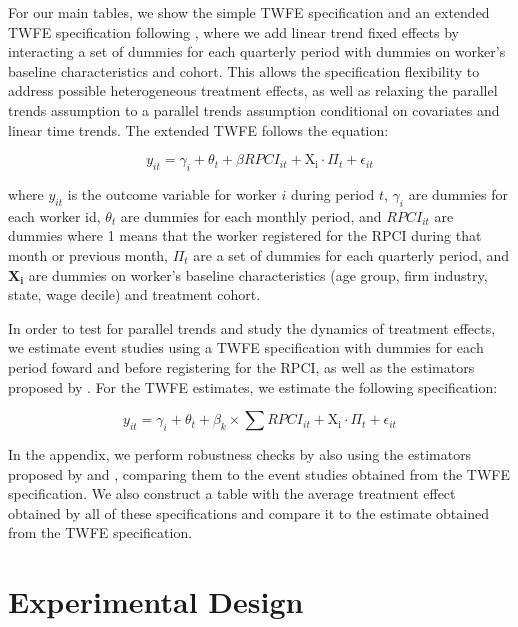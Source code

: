 \documentclass[oneside,11pt]{article}
\begin{document}
For our main tables, we show the simple TWFE specification and an extended TWFE specification following \cite{wooldridge2021two}, where we add linear trend fixed effects by interacting a set of dummies for each quarterly period with dummies on worker's baseline characteristics and cohort. This allows the specification flexibility to address possible heterogeneous treatment effects, as well as relaxing the parallel trends assumption to a parallel trends assumption conditional on covariates and linear time trends. The extended TWFE follows the equation:

\begin{equation}
    y_{it} = \gamma_{i} + \theta_{t}+ \beta RPCI_{it} + \mathrm{X_i}\cdot\Pi_t + \epsilon_{it}
\end{equation}

where $y_{it}$ is the outcome variable for worker $i$ during period $t$, $\gamma_{i}$ are dummies for each worker id, $\theta_{t}$ are dummies for each monthly period, and $RPCI_{it}$ are dummies where 1 means that the worker registered for the RPCI during that month or previous month, $\Pi_t$ are a set of dummies for each quarterly period, and $\mathbf{X_i}$ are dummies on worker's baseline characteristics (age group, firm industry, state, wage decile) and treatment cohort.

In order to test for parallel trends and study the dynamics of treatment effects, we estimate event studies using a TWFE specification with dummies for each period foward and before registering for the RPCI, as well as the estimators proposed by \cite{de2020two}. For the TWFE estimates, we estimate the following specification:

\begin{equation}
    y_{it} = \gamma_{i} + \theta_{t}+ \beta_{k} \times \sum RPCI_{it} + \mathrm{X_i}\cdot\Pi_t + \epsilon_{it}
\end{equation}

In the appendix, we perform robustness checks by also using the estimators proposed by \cite{callaway2021difference} and \cite{sun2021estimating}, comparing them to the event studies obtained from the TWFE specification. We also construct a table with the average treatment effect obtained by all of these specifications and compare it to the estimate obtained from the TWFE specification.

\section{Experimental Design} \label{Experiment}
\end{document}
